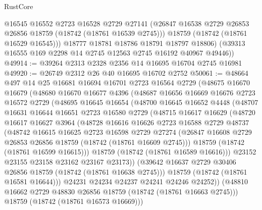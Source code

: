 \begin{lexlean}{RustCore}
\begin{coremodule}
          @16545
          @16552
          @2723
          @16528
          @2729
          @27141
          (@26847 @16538 @2729 @26853 @26856 @18759 (@18742 (@18761 @16539 @2745)))
          @18759
          (@18742 (@18761 @16529 @16545)))
        @18777
        @18781
        @18786
        @18791
        @18797
        @18806)
      (@39313 @16555 @169 @2298 @14 @2745 @12563 @2745 @16192 @40967 @49446))
@49914 := @39264 @2313 @2328 @2356 @14 @16695 @16704 @2745 @16981
@49920 := @26749 @2312 @26 @40 @16695 @16702 @2752
@50061 := @48664
    @497
    @14
    @25
    @16681
    @16694
    @16701
    @2723
    @16564
    @2729
    (@48675
      @16670
      @16679
      (@48680
        @16670
        @16677
        @4396
        (@48687
          @16656
          @16669
          @16676
          @2723
          @16572
          @2729
          (@48695
            @16645
            @16654
            (@48700
              @16645
              @16652
              @4448
              (@48707
                @16631
                @16644
                @16651
                @2723
                @16580
                @2729
                (@48715
                  @16617
                  @16629
                  (@48720
                    @16617
                    @16627
                    @3964
                    (@48728
                      @16616
                      @16626
                      @2723
                      @16588
                      @2729
                      @48737
                      (@48742
                        @16615
                        @16625
                        @2723
                        @16598
                        @2729
                        @27274
                        (@26847 @16608 @2729 @26853 @26856 @18759 (@18742 (@18761 @16609 @2745)))
                        @18759
                        (@18742 (@18761 @16599 @16615)))
                      @18759
                      (@18742 (@18761 @16589 @16616)))
                    @23152
                    @23155
                    @23158
                    @23162
                    @23167
                    @23173))
                (@39642 @16637 @2729 @30406 @26856 @18759 (@18742 (@18761 @16638 @2745)))
                @18759
                (@18742 (@18761 @16581 @16644)))
              @24231
              @24234
              @24237
              @24241
              @24246
              @24252))
          (@48810 @16662 @2729 @48830 @26856 @18759 (@18742 (@18761 @16663 @2745)))
          @18759
          (@18742 (@18761 @16573 @16669)))

\end{coremodule}
\end{lexlean}
